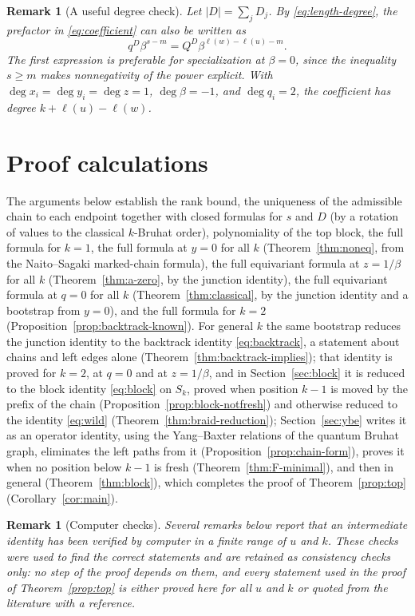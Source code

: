 \documentclass[11pt]{article}
\newtheorem{remark}[proposition]{Remark}
\newcommand{\ellength}{\ell}
\begin{document}
 \begin{remark}[A useful degree check]
 Let $|D|=\sum_jD_j$. By \eqref{eq:length-degree}, the prefactor in
 \eqref{eq:coefficient} can also be written as
 \[
 q^D\beta^{s-m}
   =Q^D\beta^{\ellength(w)-\ellength(u)-m}.
\]
The first expression is preferable for specialization at $\beta=0$,
since the inequality $s\geq m$ makes nonnegativity of the
power explicit. With
$\deg x_i=\deg y_i=\deg z=1$, $\deg\beta=-1$, and $\deg q_i=2$,
the coefficient has degree $k+\ellength(u)-\ellength(w)$.
\end{remark}

\section{Proof calculations}
\label{sec:proof}

The arguments below establish the rank bound, the uniqueness of the
admissible chain to each endpoint together with closed formulas for
$s$ and $D$ (by a rotation of values to the classical $k$-Bruhat
order), polynomiality of the
top block, the full formula for $k=1$, the full formula at $y=0$
for all $k$ (Theorem~\ref{thm:noneq}, from the Naito--Sagaki
marked-chain formula), the full equivariant formula at
$z=1/\beta$ for all $k$ (Theorem~\ref{thm:a-zero}, by the junction
identity), the full equivariant formula at $q=0$ for all $k$
(Theorem~\ref{thm:classical}, by the junction identity and a
bootstrap from $y=0$), and the full formula for $k=2$
(Proposition~\ref{prop:backtrack-known}). For general $k$ the
same bootstrap reduces the junction identity to the backtrack identity
\eqref{eq:backtrack}, a statement about chains and left edges alone
(Theorem~\ref{thm:backtrack-implies}); that identity is proved for
$k=2$, at $q=0$ and at $z=1/\beta$, and in
Section~\ref{sec:block} it is reduced to the block identity
\eqref{eq:block} on $S_k$, proved when position $k-1$ is moved by the
prefix of the chain (Proposition~\ref{prop:block-notfresh}) and
otherwise reduced to the identity \eqref{eq:wild}
(Theorem~\ref{thm:braid-reduction}); Section~\ref{sec:ybe} writes it
as an operator identity, using the Yang--Baxter relations of the
quantum Bruhat graph, eliminates the left paths from it
(Proposition~\ref{prop:chain-form}), proves it when no position
below $k-1$ is fresh (Theorem~\ref{thm:F-minimal}), and then in
general (Theorem~\ref{thm:block}), which completes the proof of
Theorem~\ref{prop:top} (Corollary~\ref{cor:main}).

\begin{remark}[Computer checks]\label{rem:checks}
Several remarks below report that an intermediate identity has been
verified by computer in a finite range of $u$ and $k$. These checks
were used to find the correct statements and are retained as
consistency checks only: no step of the proof depends on them, and
every statement used in the proof of Theorem~\ref{prop:top} is
either proved here for all $u$ and $k$ or quoted from the literature
with a reference.
\end{remark}
\end{document}
